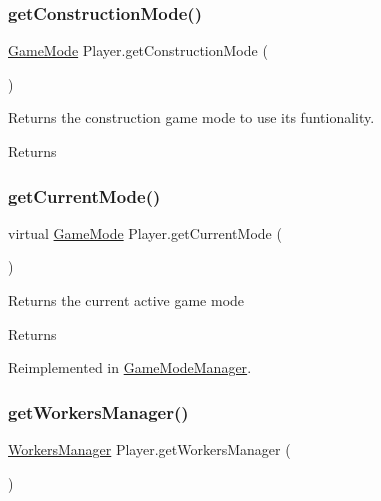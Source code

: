 \subsubsection{\texorpdfstring{get\+Construction\+Mode()}{getConstructionMode()}}
{\footnotesize\ttfamily \mbox{\hyperlink{class_game_mode}{Game\+Mode}} Player.\+get\+Construction\+Mode (\begin{DoxyParamCaption}{ }\end{DoxyParamCaption})}



Returns the construction game mode to use its funtionality. 

\begin{DoxyReturn}{Returns}

\end{DoxyReturn}
\mbox{\label{class_player_aaa2486d0dcaa57a4eb757b1e9d02d73f}} 
\subsubsection{\texorpdfstring{get\+Current\+Mode()}{getCurrentMode()}}
{\footnotesize\ttfamily virtual \mbox{\hyperlink{class_game_mode}{Game\+Mode}} Player.\+get\+Current\+Mode (\begin{DoxyParamCaption}{ }\end{DoxyParamCaption})\hspace{0.3cm}{\ttfamily [virtual]}}



Returns the current active game mode 

\begin{DoxyReturn}{Returns}

\end{DoxyReturn}


Reimplemented in \mbox{\hyperlink{class_game_mode_manager_a11cd556a3f6c2a97136de40bbf62633c}{Game\+Mode\+Manager}}.

\mbox{\label{class_player_a6f9664fa87f4c415c7dcdc4b54410d1e}} 
\subsubsection{\texorpdfstring{get\+Workers\+Manager()}{getWorkersManager()}}
{\footnotesize\ttfamily \mbox{\hyperlink{class_workers_manager}{Workers\+Manager}} Player.\+get\+Workers\+Manager (\begin{DoxyParamCaption}{ }\end{DoxyParamCaption})}



